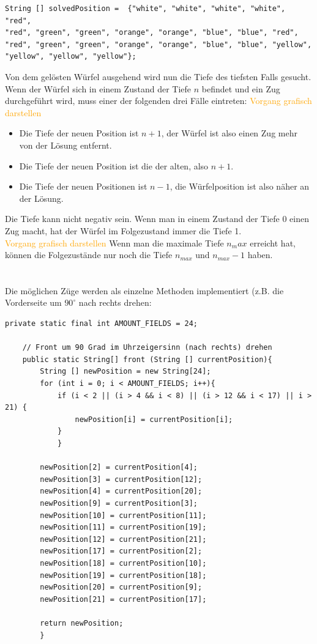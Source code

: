 \documentclass[12pt,a4paper, usenames, dvipsnames]{scrartcl}
\begin{document}
\begin{verbatim}
String [] solvedPosition =  {"white", "white", "white", "white", "red", 
"red", "green", "green", "orange", "orange", "blue", "blue", "red", 
"red", "green", "green", "orange", "orange", "blue", "blue", "yellow", 
"yellow", "yellow", "yellow"};
\end{verbatim}
Von dem gelösten Würfel ausgehend wird nun die Tiefe des tiefsten Falls gesucht. \\
Wenn der Würfel sich in einem Zustand der Tiefe $n$ befindet und ein Zug durchgeführt wird, muss einer der folgenden drei Fälle eintreten: \textcolor{orange}{Vorgang grafisch darstellen} \\ 
\begin{itemize}
	\item Die Tiefe der neuen Position ist $n+1$, der Würfel ist also einen Zug mehr von der Lösung entfernt.
	\item Die Tiefe der neuen Position ist die der alten, also $n+1$.
	\item Die Tiefe der neuen Positionen ist $n-1$, die Würfelposition ist also näher an der Lösung.
\end{itemize}
Die Tiefe kann nicht negativ sein. Wenn man in einem Zustand der Tiefe $0$ einen Zug macht, hat der Würfel im Folgezustand immer die Tiefe 1. \\ \textcolor{orange}{Vorgang grafisch darstellen}
Wenn man die maximale Tiefe $n_max$ erreicht hat, können die Folgezustände nur noch die Tiefe $n_{max}$ und $n_{max} -1$ haben. \\
\\
\\
Die möglichen Züge werden als einzelne Methoden implementiert (z.B. die Vorderseite um $90^\circ$ nach rechts drehen:
\begin{verbatim}
private static final int AMOUNT_FIELDS = 24;

    // Front um 90 Grad im Uhrzeigersinn (nach rechts) drehen
    public static String[] front (String [] currentPosition){
        String [] newPosition = new String[24];
        for (int i = 0; i < AMOUNT_FIELDS; i++){
            if (i < 2 || (i > 4 && i < 8) || (i > 12 && i < 17) || i > 21) {
                newPosition[i] = currentPosition[i];
            }
            }

        newPosition[2] = currentPosition[4];
        newPosition[3] = currentPosition[12];
        newPosition[4] = currentPosition[20];
        newPosition[9] = currentPosition[3];
        newPosition[10] = currentPosition[11];
        newPosition[11] = currentPosition[19];
        newPosition[12] = currentPosition[21];
        newPosition[17] = currentPosition[2];
        newPosition[18] = currentPosition[10];
        newPosition[19] = currentPosition[18];
        newPosition[20] = currentPosition[9];
        newPosition[21] = currentPosition[17];

        return newPosition;
        }
\end{verbatim}
\end{document}
